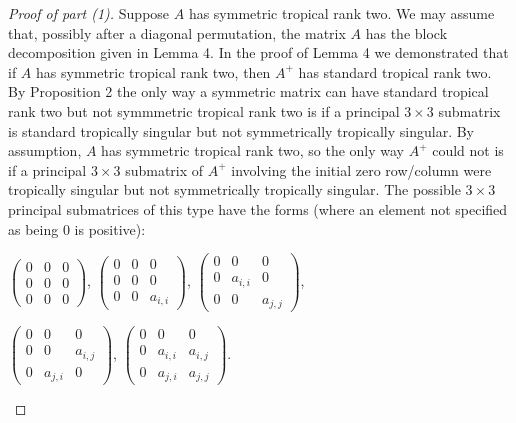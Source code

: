 \documentclass{article}
\begin{document}
\begin{proof}[Proof of part (1)]
  Suppose $A$ has symmetric tropical rank two. We may assume that, possibly after a diagonal permutation, the matrix $A$ has the block decomposition given in Lemma 4. In the proof of Lemma 4 we demonstrated that if $A$ has symmetric tropical rank two, then $A^{+}$ has standard tropical rank two. By Proposition 2 the only way a symmetric matrix can have standard tropical rank two but not symmmetric tropical rank two is if a principal $3 \times 3$ submatrix is standard tropically singular but not symmetrically tropically singular. By assumption, $A$ has symmetric tropical rank two, so the only way $A^{+}$ could not is if a principal $3 \times 3$ submatrix of $A^{+}$ involving the initial zero row/column were tropically singular but not symmetrically tropically singular. The possible $3 \times 3$ principal submatrices of this type have the forms (where an element not specified as being $0$ is positive):
  \begin{center}
    $\left(\begin{array}{ccc} 0 & 0 & 0 \\ 0 & 0 & 0 \\ 0 & 0 & 0 \end{array}\right)$, \hspace{.1 in} $\left(\begin{array}{ccc} 0 & 0 & 0 \\ 0 & 0 & 0 \\ 0 & 0 & a_{i,i} \end{array}\right)$, \hspace{.1 in} $\left(\begin{array}{ccc} 0 & 0 & 0 \\ 0 & a_{i,i} & 0 \\ 0 & 0 & a_{j,j} \end{array}\right)$,
    
    $\left(\begin{array}{ccc} 0 & 0 & 0 \\ 0 & 0 & a_{i,j} \\ 0 & a_{j,i} & 0 \end{array}\right)$, \hspace{.1 in} $\left(\begin{array}{ccc} 0 & 0 & 0 \\ 0 & a_{i,i} & a_{i,j} \\ 0 & a_{j,i} & a_{j,j} \end{array}\right)$.
  \end{center}
  

\end{proof}
\end{document}
